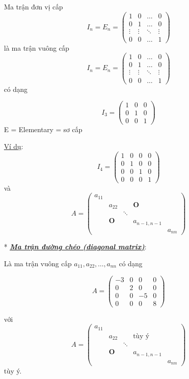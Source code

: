 \documentclass[12pt,a4paper]{article}
\let\ul\uline
\begin{document}
Ma trận đơn vị cấp $$I_n = E_n = \begin{pmatrix} 1 & 0 & \dots & 0 \\ 0 & 1 & \dots & 0 \\ \vdots & \vdots & \ddots & \vdots \\ 0 & 0 & \dots & 1 \end{pmatrix}$$ là ma trận vuông
cấp $$I_n = E_n = \begin{pmatrix} 1 & 0 & \dots & 0 \\ 0 & 1 & \dots & 0 \\ \vdots & \vdots & \ddots & \vdots \\ 0 & 0 & \dots & 1 \end{pmatrix}$$ có dạng

$$I_3 = \begin{pmatrix} 1 & 0 & 0 \\ 0 & 1 & 0 \\ 0 & 0 & 1 \end{pmatrix}$$ E = Elementary = sơ cấp

\ul{Ví dụ}: $$I_4 = \begin{pmatrix} 1 & 0 & 0 & 0 \\ 0 & 1 & 0 & 0 \\ 0 & 0 & 1 & 0 \\ 0 & 0 & 0 & 1 \end{pmatrix}$$ và
$$A = \begin{pmatrix} a_{11} & & & & \\ & a_{22} & & \mathbf{O} & \\ & & \ddots & & \\ & \mathbf{O} & & a_{n-1, n-1} & \\ & & & & a_{nn} \end{pmatrix}$$

* \emph{\textbf{\ul{Ma trận đường chéo (diagonal matrix)}}}:

Là ma trận vuông cấp $a_{11}, a_{22}, \dots, a_{nn}$ có dạng

$$A = \begin{pmatrix} -3 & 0 & 0 & 0 \\ 0 & 2 & 0 & 0 \\ 0 & 0 & -5 & 0 \\ 0 & 0 & 0 & 8 \end{pmatrix}$$

với $$A = \begin{pmatrix} a_{11} & & & & \\ & a_{22} & & \text{tùy ý} & \\ & & \ddots & & \\ & \mathbf{O} & & a_{n-1, n-1} & \\ & & & & a_{nn} \end{pmatrix}$$ tùy ý.
\end{document}
